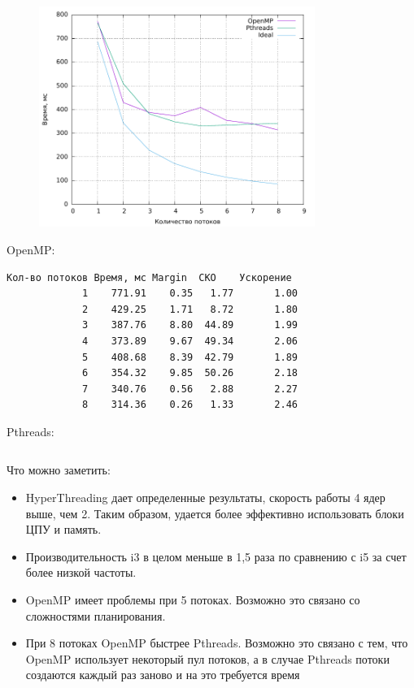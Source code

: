 \begin{figure}[H]
	\centering
	\includegraphics[width=0.8\textwidth]{../plot_laptop/plotAll.pdf}
	\caption{}
\end{figure}

OpenMP:
\begin{verbatim}
Кол-во потоков Время, мс Margin  СКО    Ускорение  
             1    771.91    0.35   1.77       1.00
             2    429.25    1.71   8.72       1.80
             3    387.76    8.80  44.89       1.99
             4    373.89    9.67  49.34       2.06
             5    408.68    8.39  42.79       1.89
             6    354.32    9.85  50.26       2.18
             7    340.76    0.56   2.88       2.27
             8    314.36    0.26   1.33       2.46
\end{verbatim}

Pthreads:
\begin{verbatim}

\end{verbatim}

Что можно заметить:
\begin{itemize}
	\item HyperThreading дает определенные результаты, скорость работы 4 ядер выше, чем 2. Таким образом, удается более эффективно использовать блоки ЦПУ и память.
	\item Производительность i3 в целом меньше в 1,5 раза по сравнению с i5 за счет более низкой частоты.
	\item OpenMP имеет проблемы при 5 потоках. Возможно это связано со сложностями планирования.
	\item При 8 потоках OpenMP быстрее Pthreads. Возможно это связано с тем, что OpenMP использует некоторый пул потоков, а в случае Pthreads потоки создаются каждый раз заново и на это требуется время
\end{itemize}

